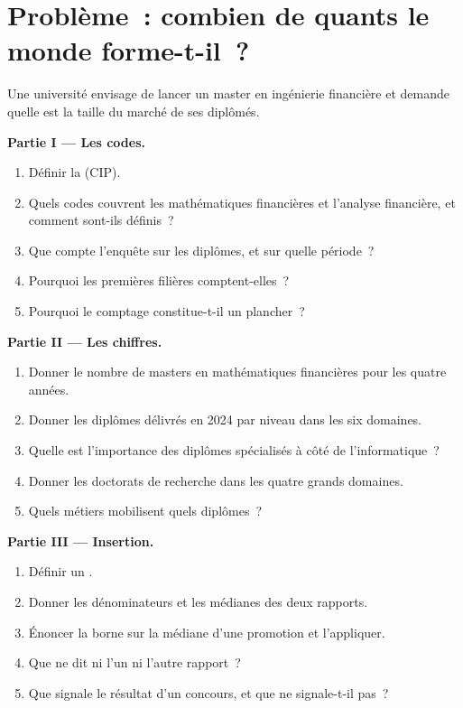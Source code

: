 \section{Problème~: combien de quants le monde forme-t-il~?}

\begin{problem}\label{pb:in:education-pipelines:1}
Une université envisage de lancer un master en ingénierie financière et demande quelle est la taille du marché de ses diplômés.

\medskip\noindent\textbf{Partie I --- Les codes.}
\begin{enumerate}
\item Définir la  (CIP).
\item Quels codes couvrent les mathématiques financières et l'analyse financière, et comment sont-ils définis~?
\item Que compte l'enquête sur les diplômes, et sur quelle période~?
\item Pourquoi les premières filières comptent-elles~?
\item Pourquoi le comptage constitue-t-il un plancher~?
\end{enumerate}

\medskip\noindent\textbf{Partie II --- Les chiffres.}
\begin{enumerate}[resume]
\item Donner le nombre de masters en mathématiques financières pour les quatre années.
\item Donner les diplômes délivrés en 2024 par niveau dans les six domaines.
\item Quelle est l'importance des diplômes spécialisés à côté de l'informatique~?
\item Donner les doctorats de recherche dans les quatre grands domaines.
\item Quels métiers mobilisent quels diplômes~?
\end{enumerate}

\medskip\noindent\textbf{Partie III --- Insertion.}
\begin{enumerate}[resume]
\item Définir un .
\item Donner les dénominateurs et les médianes des deux rapports.
\item Énoncer la borne sur la médiane d'une promotion et l'appliquer.
\item Que ne dit ni l'un ni l'autre rapport~?
\item Que signale le résultat d'un concours, et que ne signale-t-il pas~?
\end{enumerate}


\end{problem}
